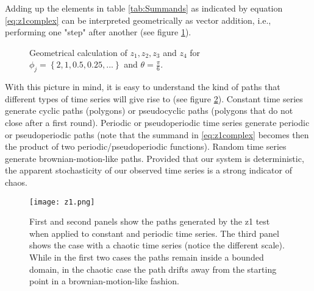 Adding up the elements in table \ref{tab:Summands} as indicated by equation \eqref{eq:z1complex} can be interpreted geometrically as vector addition, i.e., performing one "step" after another (see figure \ref{fig:Sum}).

\begin{figure}[H]
\begin{center}
\end{center}
\caption{\label{fig:Sum} Geometrical calculation of $z_1, z_2, z_3$ and  $z_4$ for $\phi_j = \left\lbrace 2, 1, 0.5, 0.25, ...\right\rbrace$ and $\theta = \frac{\pi}{6}$.}
\end{figure}

With this picture in mind, it is easy to understand the kind of paths that different types of time series will give rise to (see figure \ref{fig:z1Path}). Constant time series generate cyclic paths (polygons) or pseudocyclic paths (polygons that do not close after a first round). Periodic or pseudoperiodic time series generate periodic or pseudoperiodic paths (note that the summand in \eqref{eq:z1complex} becomes then the product of two periodic/pseudoperiodic functions). Random time series generate brownian-motion-like paths. Provided that our system is deterministic, the apparent stochasticity of our observed time series is a strong indicator of chaos.

\begin{figure}
	\begin{center}
		\texttt{[image: z1.png]}
	\end{center}
	\caption{First and second panels show the paths generated by the z1 test when applied to constant and periodic time series. The third panel shows the case with a chaotic time series (notice the different scale). While in the first two cases the paths remain inside a bounded domain, in the chaotic case the path drifts away from the starting point in a brownian-motion-like fashion.}
	\label{fig:z1Path}
\end{figure}

